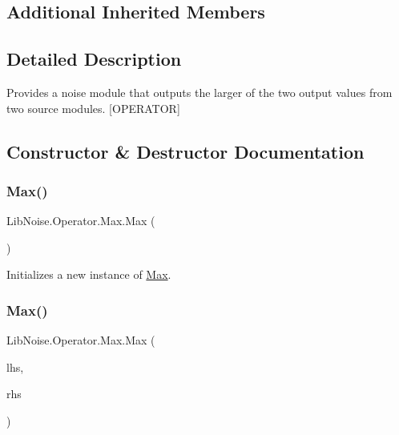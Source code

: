 \subsection*{Additional Inherited Members}


\subsection{Detailed Description}
Provides a noise module that outputs the larger of the two output values from two source modules. \mbox{[}O\+P\+E\+R\+A\+T\+OR\mbox{]} 



\subsection{Constructor \& Destructor Documentation}
\mbox{\label{class_lib_noise_1_1_operator_1_1_max_a08acd86d5b4797df45cacc09aaca0d07}} 
\subsubsection{\texorpdfstring{Max()}{Max()}\hspace{0.1cm}{\footnotesize\ttfamily [1/2]}}
{\footnotesize\ttfamily Lib\+Noise.\+Operator.\+Max.\+Max (\begin{DoxyParamCaption}{ }\end{DoxyParamCaption})}



Initializes a new instance of \hyperlink{class_lib_noise_1_1_operator_1_1_max}{Max}. 

\mbox{\label{class_lib_noise_1_1_operator_1_1_max_a5b6ee0fbc56ff7fa883d8fec7c42a89d}} 
\subsubsection{\texorpdfstring{Max()}{Max()}\hspace{0.1cm}{\footnotesize\ttfamily [2/2]}}
{\footnotesize\ttfamily Lib\+Noise.\+Operator.\+Max.\+Max (\begin{DoxyParamCaption}\item[{\hyperlink{class_lib_noise_1_1_module_base}{Module\+Base}}]{lhs,  }\item[{\hyperlink{class_lib_noise_1_1_module_base}{Module\+Base}}]{rhs }\end{DoxyParamCaption})}



